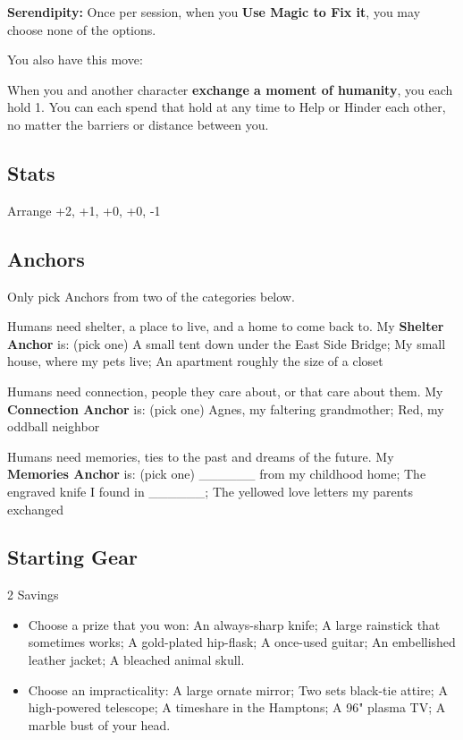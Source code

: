 \documentclass[
]{memoir}
\begin{document}
\textbf{Serendipity:} Once per session, when you \textbf{Use Magic to
Fix it}, you may choose none of the options.

You also have this move:

When you and another character \textbf{exchange a moment of humanity},
you each hold 1. You can each spend that hold at any time to Help or
Hinder each other, no matter the barriers or distance between you.

\hypertarget{stats-6}{%
\subsection{Stats}\label{stats-6}}

Arrange +2, +1, +0, +0, -1

\hypertarget{anchors-5}{%
\subsection{Anchors}\label{anchors-5}}

Only pick Anchors from two of the categories below.

Humans need shelter, a place to live, and a home to come back to. My
\textbf{Shelter Anchor} is: (pick one) A small tent down under the East
Side Bridge; My small house, where my pets live; An apartment roughly
the size of a closet

Humans need connection, people they care about, or that care about them.
My \textbf{Connection Anchor} is: (pick one) Agnes, my faltering
grandmother; Red, my oddball neighbor

Humans need memories, ties to the past and dreams of the future. My
\textbf{Memories Anchor} is: (pick one) \_\_\_\_\_\_ from my childhood
home; The engraved knife I found in \_\_\_\_\_\_; The yellowed love
letters my parents exchanged

\hypertarget{starting-gear-5}{%
\subsection{Starting Gear}\label{starting-gear-5}}

2 Savings

\begin{itemize}
\tightlist
\item
  Choose a prize that you won: An always-sharp knife; A large rainstick
  that sometimes works; A gold-plated hip-flask; A once-used guitar; An
  embellished leather jacket; A bleached animal skull.
\item
  Choose an impracticality: A large ornate mirror; Two sets black-tie
  attire; A high-powered telescope; A timeshare in the Hamptons; A 96"
  plasma TV; A marble bust of your head.
\end{itemize}
\end{document}
